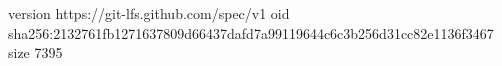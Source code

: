 version https://git-lfs.github.com/spec/v1
oid sha256:2132761fb1271637809d66437dafd7a99119644c6c3b256d31cc82e1136f3467
size 7395

